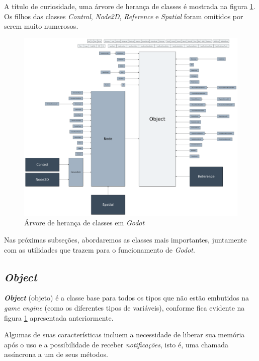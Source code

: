A título de curiosidade, uma árvore de herança de classes é mostrada na figura \ref{godotClasses}. Os filhos das classes \textit{Control}, \textit{Node2D}, \textit{Reference} e \textit{Spatial} foram omitidos por serem muito numerosos.

\begin{figure}[H]
  \centering
  \includegraphics[width=\textwidth]{image/godot-classes.png}
  \caption{Árvore de herança de classes em \textit{Godot} \citep{godotClasses}}
  \label{godotClasses}
\end{figure}

Nas próximas subseções, abordaremos as classes mais importantes, juntamente com as utilidades que trazem para o funcionamento de \textit{Godot}.


\subsection{\textit{Object}}

\textbf{\textit{Object}} (objeto) é a classe base para todos os tipos que não estão embutidos na \textit{game engine} (como os diferentes tipos de variáveis), conforme fica evidente na figura \ref{godotClasses} apresentada anteriormente.

Algumas de suas características incluem a necessidade de liberar sua memória após o uso e a possibilidade de receber \emph{notificações}, isto é, uma chamada assíncrona a um de seus métodos.

